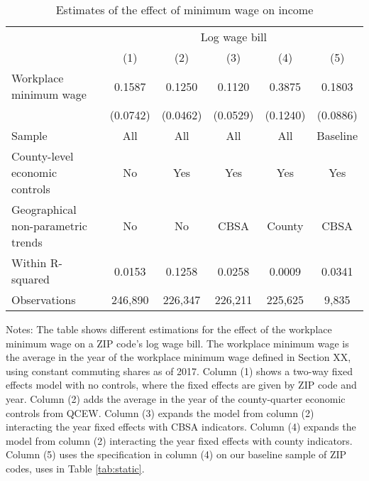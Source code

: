 \begin{table}[]
    \caption{Estimates of the effect of minimum wage on income}
    \label{tab:static_wages}

    \begin{tabular}{@{}lccccc@{}}
        \toprule
                                        & \multicolumn{5}{c}{Log wage bill}                         \\ \cmidrule(l){2-6} 
                                        & (1)       & (2)      & (3)      & (4)      & (5)          \\ \midrule
        Workplace minimum wage             & 0.1587    & 0.1250   & 0.1120   & 0.3875      & 0.1803     \\
                                        & (0.0742)  & (0.0462) & (0.0529) & (0.1240)    & (0.0886)   \\ \midrule
        Sample                             & All       & All      & All      & All       & Baseline     \\
        County-level economic controls     & No        & Yes      & Yes      & Yes       & Yes          \\
        Geographical non-parametric trends & No        & No       & CBSA     & County     & CBSA         \\
        Within R-squared                   & 0.0153   & 0.1258   & 0.0258   & 0.0009     & 0.0341        \\
        Observations                       & 246,890   & 226,347  & 226,211  & 225,625    & 9,835       \\ \bottomrule
    \end{tabular}
    
    \begin{minipage}{.95\textwidth} \footnotesize
        \vspace{2mm}
        Notes: The table shows different estimations for the effect of the workplace minimum 
        wage on a ZIP code's log wage bill.
        The workplace minimum wage is the average in the year of the workplace minimum wage 
        defined in Section XX, using constant commuting shares as of 2017.
        Column (1) shows a two-way fixed effects model with no controls, where the fixed 
        effects are given by ZIP code and year.
        Column (2) adds the average in the year of the county-quarter economic controls from
        QCEW.
        Column (3) expands the model from column (2) interacting the year fixed effects 
        with CBSA indicators.
        Column (4) expands the model from column (2) interacting the year fixed effects 
        with county indicators.
        Column (5) uses the specification in column (4) on our baseline sample of ZIP codes,
        uses in Table \ref{tab:static}.
    \end{minipage}
\end{table}

